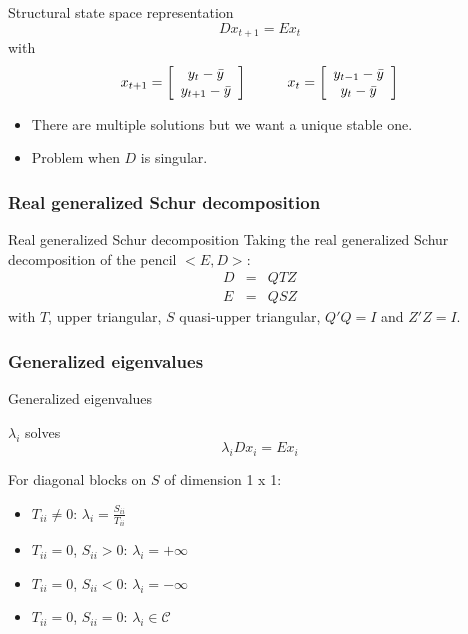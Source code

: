 \documentclass{beamer}
\begin{document}
\begin{slide}{Structural state space representation}
\[
Dx_{t+1} = Ex_t
\]
with
\[
x_{t+1} = \left[\begin{array}{c}
    y_t-\bar y \\ y_{t+1}-\bar y
  \end{array}\right]
\hspace{10mm}
x_t = \left[\begin{array}{c}
    y_{t-1}-\bar y \\ y_t-\bar y
  \end{array}\right]
\]
\begin{itemize}
\item There are multiple solutions but we want a unique stable one.\\
\item Problem when $D$ is singular.
\end{itemize}
\end{slide}

\subsubsection[Real generalized Schur decomposition]{Real generalized Schur decomposition}
\begin{slide}{Real generalized Schur decomposition}
Taking the real generalized Schur decomposition of the pencil $<E,D>$:
\begin{eqnarray*}
D&=&QTZ\\
E&=&QSZ
\end{eqnarray*}
with $T$, upper triangular, $S$ quasi-upper triangular, $Q'Q=I$ and $Z'Z=I$.
\end{slide}

\subsubsection[Generalized eigenvalues]{Generalized eigenvalues}
\begin{slide}{Generalized eigenvalues}

$\lambda_i$ solves
\[
\lambda_iDx_i = E x_i
\]

For diagonal blocks on $S$ of dimension 1 x 1:
\begin{itemize}
\item $T_{ii} \ne 0$: $\lambda_i = \frac{S_{ii}}{T_{ii}}$
\item $T_{ii} = 0$, $S_{ii} > 0$: $\lambda_i = +\infty$
\item $T_{ii} = 0$, $S_{ii} < 0$: $\lambda_i = -\infty$
\item $T_{ii} = 0$, $S_{ii} = 0$: $\lambda_i \in \mathcal{C}$
\end{itemize}

\end{slide}
\end{document}
